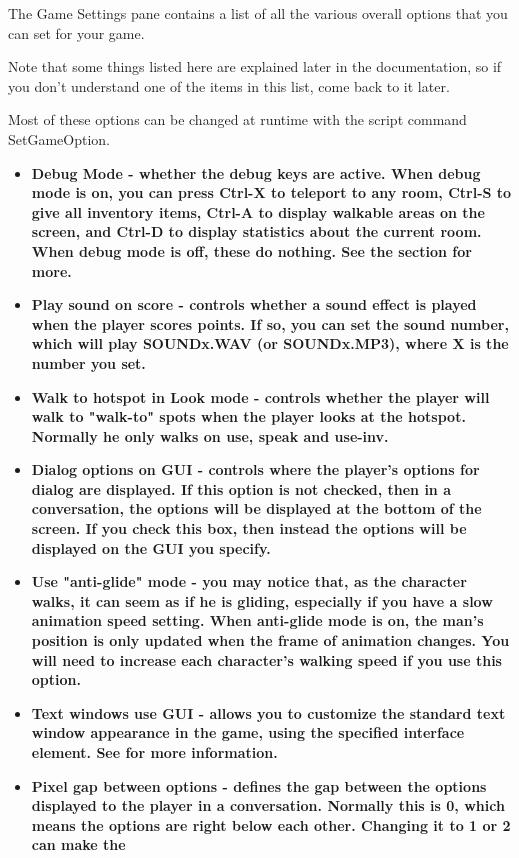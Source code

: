 The Game Settings pane contains a list of all the various overall options
that you can set for your game.

Note that some things listed here are explained later in the documentation,
so if you don't understand one of the items in this list, come back to it
later.

Most of these options can be changed at runtime with the script command SetGameOption.
\begin{itemize}
\item \bf{Debug Mode} - whether the debug keys are active. When debug mode is on,
you can press Ctrl-X to teleport to any room, Ctrl-S to give all inventory
items, Ctrl-A to display walkable areas on the screen, and Ctrl-D to display
statistics about the current room. When debug mode is off, these do nothing.
See the  section for more.
\item \bf{Play sound on score} - controls whether a sound effect is played when
the player scores points. If so, you can set the sound number, which will
play SOUNDx.WAV (or SOUNDx.MP3), where X is the number you set.
\item \bf{Walk to hotspot in Look mode} - controls whether the player will walk
to "walk-to" spots when the player looks at the hotspot. Normally he only
walks on use, speak and use-inv.
\item \bf{Dialog options on GUI} - controls where the player's options for dialog are
displayed. If this option is not checked, then in a conversation, the options
will be displayed at the bottom of the screen. If you check this box, then
instead the options will be displayed on the GUI you specify.
\item \bf{Use "anti-glide" mode} - you may notice that, as the character walks, it
can seem as if he is gliding, especially if you have a slow animation speed
setting. When anti-glide mode is on, the man's position is only updated
when the frame of animation changes. You will need to increase each
character's walking speed if you use this option.
\item \bf{Text windows use GUI} - allows you to customize the standard text window
appearance in the game, using the specified interface element. See 
for more information.
\item \bf{Pixel gap between options} - defines the gap between the options displayed
to the player in a conversation. Normally this is 0, which means the
options are right below each other. Changing it to 1 or 2 can make the

\end{itemize}

